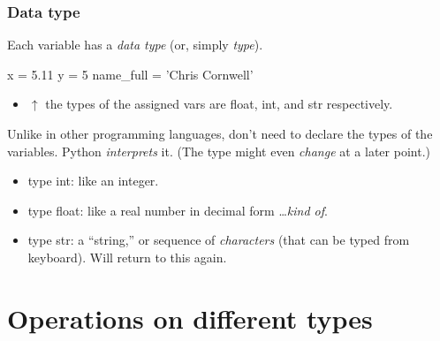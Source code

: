\documentclass{beamer}
\newenvironment{codeblock}
    {\hfill\begin{beamerboxesrounded}[lower=codecol, width=0.8\textwidth]
    \medskip

    }
    { 
    \end{beamerboxesrounded}\hfill
    }
\theoremstyle{example}
\begin{document}
\begin{frame}[fragile]
\frametitle{Data type}

Each variable has a \emph{data type} (or, simply \emph{type}). 

\begin{codeblock}

\begin{python}
x = 5.11
y = 5
name_full = 'Chris Cornwell'
\end{python}

\end{codeblock}

\begin{itemize}
	\item[] $\uparrow$ the types of the assigned vars are {\ttb float}, {\ttb int}, and {\ttb str} respectively.
\end{itemize}

\pause
Unlike in other programming languages, don't need to declare the types of the variables. Python \emph{interprets} it. (The type might even \emph{change} at a later point.)

\begin{itemize}
	\item type {\ttb int}: like an integer.
	\item type {\ttb float}: like a real number in decimal form \ldots \emph{kind of}.
	\item type {\ttb str}: a ``string,'' or sequence of \emph{characters} (that can be typed from keyboard). Will return to this again.
\end{itemize}
\end{frame}

\section{Operations on different types}
\end{document}
